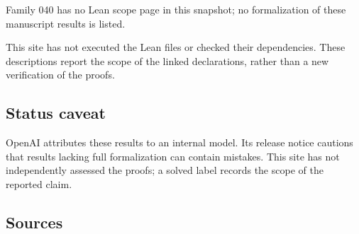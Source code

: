 \documentclass[11pt]{article}
\begin{document}
Family 040 has no Lean scope page in this snapshot; no formalization of these manuscript results is listed.

This site has not executed the Lean files or checked their dependencies. These descriptions report the scope of the linked declarations, rather than a new verification of the proofs.

\subsection{Status caveat}
OpenAI attributes these results to an internal model. Its release notice cautions that results lacking full formalization can contain mistakes. This site has not independently assessed the proofs; a solved label records the scope of the reported claim.

\subsection{Sources}
\end{document}
